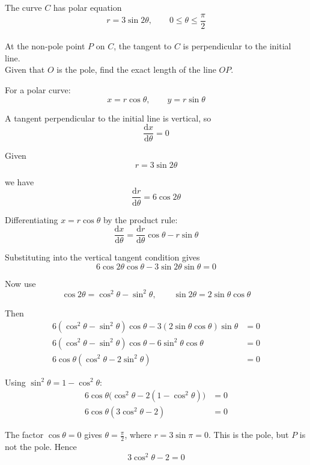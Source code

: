\documentclass[leqno]{article}
\begin{document}
\djsFrontMatter
\begin{enumerate}[
  label=\textbf{\arabic*.},
  leftmargin=*,
  topsep=0pt,
  partopsep=0pt,
  parsep=0pt
]

\questionitem

The curve $C$ has polar equation
\[
r = 3\sin 2\theta, \qquad 0 \leq \theta \leq \frac{\pi}{2}
\]
\\
At the non-pole point $P$ on $C$, the tangent to $C$ is perpendicular to the initial line. \\

Given that $O$ is the pole, find the exact length of the line $OP$. 

\vspace*{10pt}
\begin{djsSolution}
For a polar curve:
\[
x=r\cos\theta,\qquad y=r\sin\theta
\]

A tangent perpendicular to the initial line is vertical, so
\[
\frac{\mathrm{d}x}{\mathrm{d}\theta}=0
\]

Given
\[
r=3\sin 2\theta
\]

we have
\[
\frac{\mathrm{d}r}{\mathrm{d}\theta}=6\cos 2\theta
\]

Differentiating \(x=r\cos\theta\) by the product rule:
\[
\frac{\mathrm{d}x}{\mathrm{d}\theta}=\frac{\mathrm{d}r}{\mathrm{d}\theta}\cos\theta-r\sin\theta
\]

Substituting into the vertical tangent condition gives
\[
6\cos 2\theta\cos\theta-3\sin 2\theta\sin\theta=0
\]

Now use
\[
\cos 2\theta=\cos^2\theta-\sin^2\theta,
\qquad
\sin 2\theta=2\sin\theta\cos\theta
\]

Then
\begin{align*}
6(\cos^2\theta-\sin^2\theta)\cos\theta-3(2\sin\theta\cos\theta)\sin\theta&=0\\
6(\cos^2\theta-\sin^2\theta)\cos\theta-6\sin^2\theta\cos\theta&=0\\
6\cos\theta(\cos^2\theta-2\sin^2\theta)&=0
\end{align*}

Using \(\sin^2\theta=1-\cos^2\theta\):
\begin{align*}
6\cos\theta\bigl(\cos^2\theta-2(1-\cos^2\theta)\bigr)&=0\\
6\cos\theta(3\cos^2\theta-2)&=0
\end{align*}

The factor \(\cos\theta=0\) gives \(\theta=\frac{\pi}{2}\), where \(r=3\sin\pi=0\). This is the pole, but \(P\) is not the pole. Hence
\[
3\cos^2\theta-2=0
\]


\end{djsSolution}
\end{enumerate}
\end{document}
